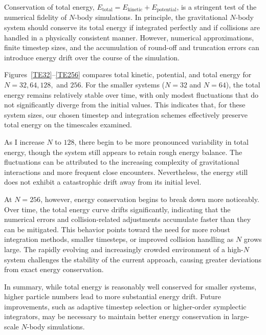 \documentclass[a4paper, 12pt, oneside, onecolumn]{article}
\begin{document}
\begin{multicols}{2}

Conservation of total energy, $E_{\text{total}} = E_{\text{kinetic}} + E_{\text{potential}}$, is a stringent test of the numerical fidelity of $N$-body simulations. In principle, the gravitational $N$-body system should conserve its total energy if integrated perfectly and if collisions are handled in a physically consistent manner. However, numerical approximations, finite timestep sizes, and the accumulation of round-off and truncation errors can introduce energy drift over the course of the simulation.

Figures~\ref{TE32}--\ref{TE256} compares total kinetic, potential, and total energy for $N = 32, 64, 128,$ and $256$. For the smaller systems ($N = 32$ and $N = 64$), the total energy remains relatively stable over time, with only modest fluctuations that do not significantly diverge from the initial values. This indicates that, for these system sizes, our chosen timestep and integration schemes effectively preserve total energy on the timescales examined.

As I increase $N$ to $128$, there begin to be more pronounced variability in total energy, though the system still appears to retain rough energy balance. The fluctuations can be attributed to the increasing complexity of gravitational interactions and more frequent close encounters. Nevertheless, the energy still does not exhibit a catastrophic drift away from its initial level.

At $N = 256$, however, energy conservation begins to break down more noticeably. Over time, the total energy curve drifts significantly, indicating that the numerical errors and collision-related adjustments accumulate faster than they can be mitigated. This behavior points toward the need for more robust integration methods, smaller timesteps, or improved collision handling as $N$ grows large. The rapidly evolving and increasingly crowded environment of a high-$N$ system challenges the stability of the current approach, causing greater deviations from exact energy conservation.

In summary, while total energy is reasonably well conserved for smaller systems, higher particle numbers lead to more substantial energy drift. Future improvements, such as adaptive timestep selection or higher-order symplectic integrators, may be necessary to maintain better energy conservation in large-scale $N$-body simulations.






\end{multicols}
\end{document}
